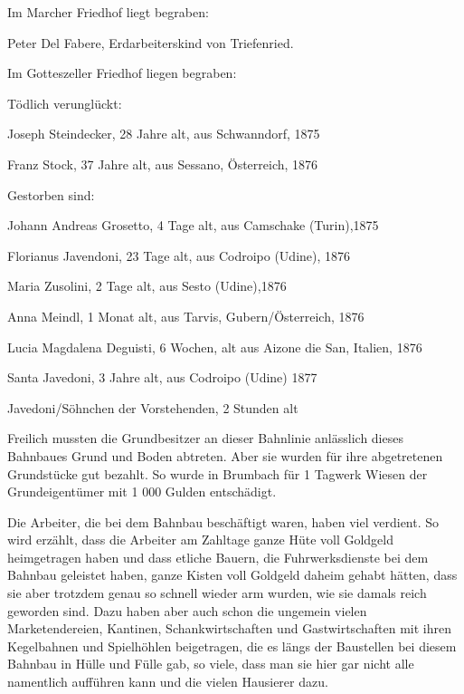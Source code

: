 \documentclass{book}
\begin{document}
Im Marcher Friedhof liegt begraben:

\begin{compactitem}
\item Peter Del Fabere, Erdarbeiterskind von Triefenried.
\end{compactitem}

Im Gotteszeller Friedhof liegen begraben:

Tödlich verunglückt:

\begin{compactitem}
\item Joseph Steindecker, 28 Jahre alt, aus Schwanndorf, 1875
\item Franz Stock, 37 Jahre alt, aus Sessano, Österreich, 1876
\end{compactitem}

Gestorben sind:

\begin{compactitem}
\item Johann Andreas Grosetto, 4 Tage alt, aus Camschake (Turin),1875
\item Florianus Javendoni, 23 Tage alt, aus Codroipo (Udine), 1876
\item Maria Zusolini, 2 Tage alt, aus Sesto (Udine),1876
\item Anna Meindl, 1 Monat alt, aus Tarvis, Gubern/Österreich, 1876

\item Lucia Magdalena Deguisti, 6 Wochen, alt aus Aizone die San,
Italien, 1876

\item Santa Javedoni, 3 Jahre alt, aus Codroipo (Udine) 1877
\item Javedoni/Söhnchen der Vorstehenden, 2 Stunden alt
\end{compactitem}

Freilich mussten die Grundbesitzer an dieser Bahnlinie anlässlich dieses
Bahnbaues Grund und Boden abtreten. Aber sie wurden für ihre
abgetretenen Grundstücke gut bezahlt. So wurde in Brumbach für 1 Tagwerk
Wiesen der Grundeigentümer mit 1 000 Gulden entschädigt.

Die Arbeiter, die bei dem Bahnbau beschäftigt waren, haben viel
verdient. So wird erzählt, dass die Arbeiter am Zahltage ganze Hüte voll
Goldgeld heimgetragen haben und dass etliche Bauern, die
Fuhrwerksdienste bei dem Bahnbau geleistet haben, ganze Kisten voll
Goldgeld daheim gehabt hätten, dass sie aber trotzdem genau so schnell
wieder arm wurden, wie sie damals reich geworden sind. Dazu haben aber
auch schon die ungemein vielen Marketendereien, Kantinen,
Schankwirtschaften und Gastwirtschaften mit ihren Kegelbahnen und
Spielhöhlen beigetragen, die es längs der Baustellen bei diesem Bahnbau
in Hülle und Fülle gab, so viele, dass man sie hier gar nicht alle
namentlich aufführen kann und die vielen Hausierer dazu.
\end{document}
